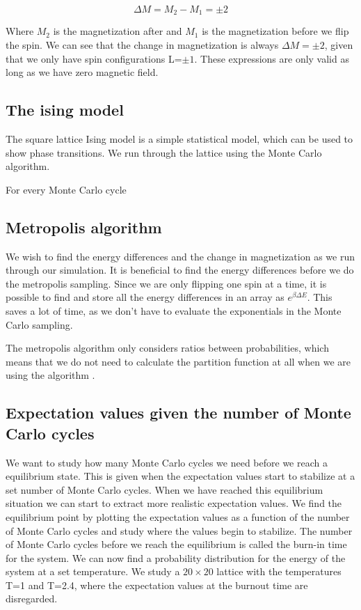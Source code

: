 \documentclass{article}
\begin{document}
\begin{multicols}{2}
\begin{equation}
\Delta M = M_2-M_1=\pm2
\label{eq:dM}
\end{equation}

Where $M_2$ is the magnetization after and $M_1$ is the magnetization before we flip the spin. We can see that the change in magnetization is always $\Delta M=\pm2$, given that we only have spin configurations L=$\pm1$. These expressions are only valid as long as we have zero magnetic field. 

\subsection*{The ising model}

The square lattice Ising model is a simple statistical model, which can be used to show phase transitions. We run through the lattice using the Monte Carlo algorithm.

For every Monte Carlo cycle 


\subsection*{Metropolis algorithm}

We wish to find the energy differences and the change in magnetization as we run through our simulation. It is beneficial to find the energy differences before we do the metropolis sampling. Since we are only flipping one spin at a time, it is possible to find and store all the energy differences in an array as $e^{\beta\Delta E}$. This saves a lot of time, as we don't have to evaluate the exponentials in the Monte Carlo sampling. 

The metropolis algorithm only considers ratios between probabilities, which means that we do not need to calculate the partition function at all when we are using the algorithm \cite{94}. 

\subsection*{Expectation values given the number of Monte Carlo cycles}

We want to study how many Monte Carlo cycles we need before we reach a equilibrium state. This is given when the expectation values start to stabilize at a set number of Monte Carlo cycles. When we have reached this equilibrium situation we can start to extract more realistic expectation values. We find the equilibrium point by plotting the expectation values as a function of the number of Monte Carlo cycles and study where the values begin to stabilize. The number of Monte Carlo cycles before we reach the equilibrium is called the burn-in time for the system. We can now find a probability distribution for the energy of the system at a set temperature. We study a $20\times20$ lattice with the temperatures T=1 and T=2.4, where the expectation values at the burnout time are disregarded. 



\end{multicols}
\end{document}
